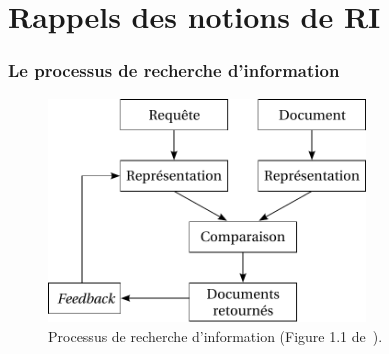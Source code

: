 \documentclass[12pt,aspectratio=43,dvipsnames,table]{beamer}
\begin{document}
\section{Rappels des notions de RI}


\begin{frame}
    \frametitle{Le processus de recherche d'information}
    \begin{figure}
    \centering
    \includegraphics[width=0.75\textwidth]{img/typicalIR.pdf}
    \caption{Processus de recherche d'information (Figure 1.1 
             de~\cite{DBLP:series/synthesis/2010Nie}).}
    \end{figure}
\end{frame}
\end{document}
